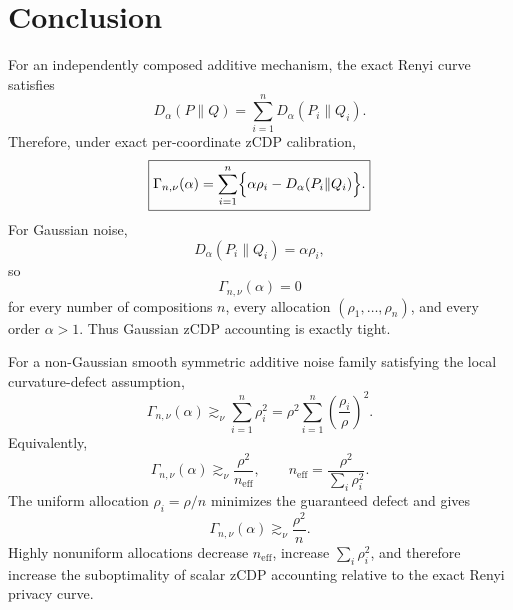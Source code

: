 \documentclass[11pt]{article}
\begin{document}
\section{Conclusion}

For an independently composed additive mechanism, the exact Renyi curve satisfies
\[
D_\alpha(P\|Q)
=
\sum_{i=1}^nD_\alpha(P_i\|Q_i).
\]
Therefore, under exact per-coordinate zCDP calibration,
\[
\boxed{
\Gamma_{n,\nu}(\alpha)
=
\sum_{i=1}^n
\Bigl\{\alpha\rho_i-D_\alpha(P_i\|Q_i)\Bigr\}.
}
\]
For Gaussian noise,
\[
D_\alpha(P_i\|Q_i)=\alpha\rho_i,
\]
so
\[
\Gamma_{n,\nu}(\alpha)=0
\]
for every number of compositions \(n\), every allocation
\((\rho_1, \dots,\rho_n)\), and every order \(\alpha>1\). Thus Gaussian zCDP
accounting is exactly tight.

For a non-Gaussian smooth symmetric additive noise family satisfying the local
curvature-defect assumption,
\[
\boxed{
\Gamma_{n,\nu}(\alpha)
\gtrsim_\nu
\sum_{i=1}^n\rho_i^2
=
\rho^2\sum_{i=1}^n\left(\frac{\rho_i}{\rho}\right)^2.
}
\]
Equivalently,
\[
\boxed{
\Gamma_{n,\nu}(\alpha)
\gtrsim_\nu
\frac{\rho^2}{n_{\mathrm{eff}}},
\qquad
n_{\mathrm{eff}}
=
\frac{\rho^2}{\sum_i\rho_i^2}.
}
\]
The uniform allocation \(\rho_i=\rho/n\) minimizes the guaranteed defect and gives
\[
\Gamma_{n,\nu}(\alpha)
\gtrsim_\nu
\frac{\rho^2}{n}.
\]
Highly nonuniform allocations decrease \(n_{\mathrm{eff}}\), increase
\(\sum_i\rho_i^2\), and therefore increase the suboptimality of scalar zCDP
accounting relative to the exact Renyi privacy curve.
\end{document}
